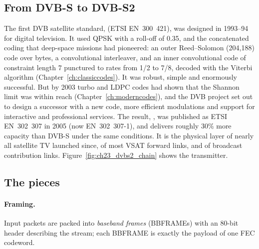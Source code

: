 \subsection{From DVB-S to DVB-S2}

The first DVB satellite standard,  (ETSI EN~300~421), was designed in 1993--94
for digital television. It used QPSK with a roll-off of 0.35, and the concatenated coding that
deep-space missions had pioneered: an outer Reed--Solomon (204,188) code over bytes, a
convolutional interleaver, and an inner convolutional code of constraint length 7 punctured to
rates from 1/2 to 7/8, decoded with the Viterbi algorithm (Chapter~\ref{ch:classiccodes}). It
was robust, simple and enormously successful. But by 2003 turbo and LDPC codes had shown that the
Shannon limit was within reach (Chapter~\ref{ch:moderncodes}), and the DVB project set out to
design a successor with a new code, more efficient modulations and support for interactive
and professional services. The result, , was published as ETSI EN~302~307 in 2005
(now EN~302~307-1), and delivers roughly 30\% more capacity than DVB-S under the same conditions.
It is the physical layer of nearly all satellite TV launched since, of most VSAT forward links,
and of broadcast contribution links. Figure~\ref{fig:ch23_dvbs2_chain} shows the transmitter.


\subsection{The pieces}


\paragraph{Framing.} Input packets are packed into \emph{baseband frames} (BBFRAMEs) with an
80-bit header describing the stream; each BBFRAME is exactly the payload of one FEC codeword.

